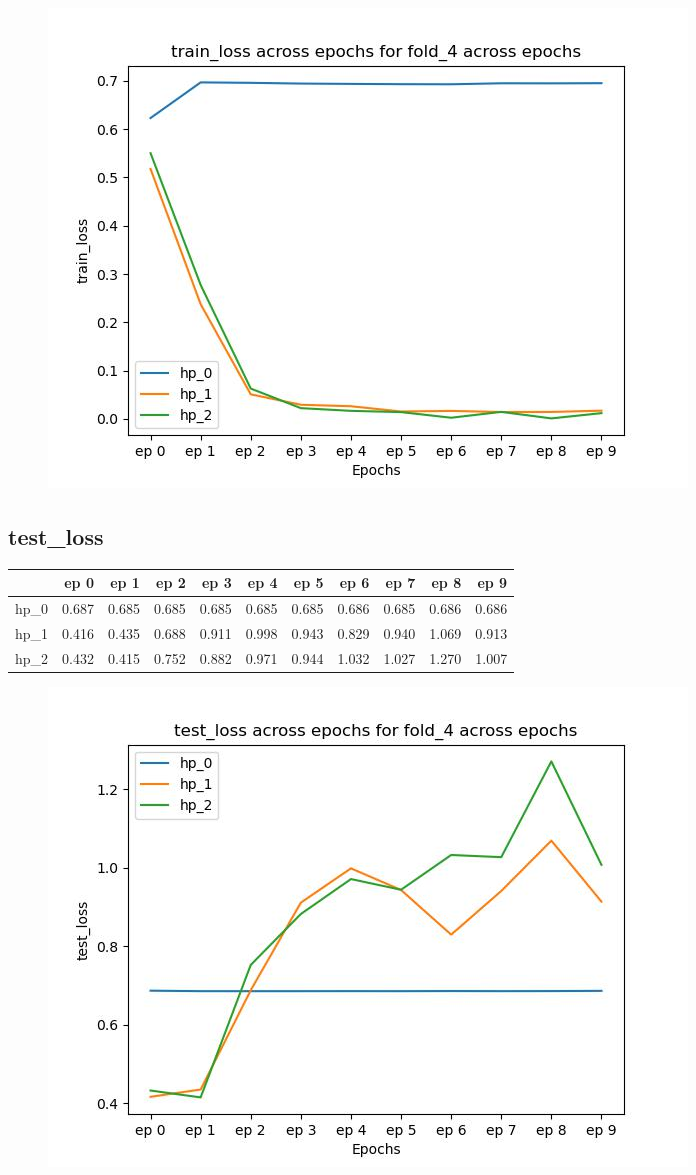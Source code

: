 \documentclass{article}
\begin{document}
\begin{figure}[H]
\includegraphics[scale = 0.75]{fold_4/train_loss}
\end{figure}
\subsection{test\_loss}
\begin{tabular}{lrrrrrrrrrr}
\toprule
{} &   ep 0 &   ep 1 &   ep 2 &   ep 3 &   ep 4 &   ep 5 &   ep 6 &   ep 7 &   ep 8 &   ep 9 \\
\midrule
hp\_0 &  0.687 &  0.685 &  0.685 &  0.685 &  0.685 &  0.685 &  0.686 &  0.685 &  0.686 &  0.686 \\
hp\_1 &  0.416 &  0.435 &  0.688 &  0.911 &  0.998 &  0.943 &  0.829 &  0.940 &  1.069 &  0.913 \\
hp\_2 &  0.432 &  0.415 &  0.752 &  0.882 &  0.971 &  0.944 &  1.032 &  1.027 &  1.270 &  1.007 \\
\bottomrule
\end{tabular}

\begin{figure}[H]
\includegraphics[scale = 0.75]{fold_4/test_loss}
\end{figure}
\end{document}
